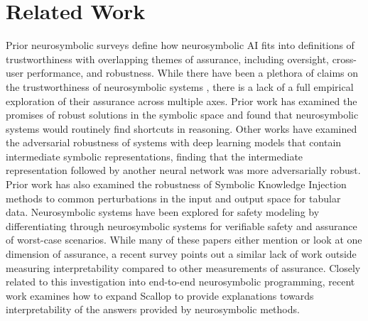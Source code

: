\section{Related Work}
Prior neurosymbolic surveys \cite{agiollo2023measuring} define how neurosymbolic AI fits into definitions of trustworthiness with overlapping themes of assurance, including oversight, cross-user performance, and robustness. While there have been a plethora of claims on the trustworthiness of neurosymbolic systems \cite{wagner2024neurosymbolic}, there is a lack of a full empirical exploration of their assurance across multiple axes. Prior work has examined the promises of robust solutions in the symbolic space \cite{marconato2024not} and found that neurosymbolic systems would routinely find shortcuts in reasoning. Other works \cite{sitawarinpart} have examined the adversarial robustness of systems with deep learning models that contain intermediate symbolic representations, finding that the intermediate representation followed by another neural network was more adversarially robust. Prior work \cite{rafanelli2024empirical} has also examined the robustness of Symbolic Knowledge Injection methods to common perturbations in the input and output space for tabular data. Neurosymbolic systems have been explored for safety modeling \cite{yang2022safe} by differentiating through neurosymbolic systems for verifiable safety and assurance of worst-case scenarios. While many of these papers either mention or look at one dimension of assurance, a recent survey \cite{michel2024neuro} points out a similar lack of work outside measuring interpretability compared to other measurements of assurance. Closely related to this investigation into end-to-end neurosymbolic programming, recent work \cite{paul2024formal} examines how to expand Scallop to provide explanations towards interpretability of the answers provided by neurosymbolic methods.